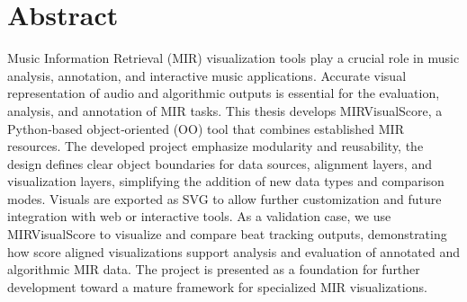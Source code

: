 \chapter*{Abstract}

Music Information Retrieval (MIR) visualization tools play a crucial role in music analysis, annotation, and interactive music applications. Accurate visual representation of audio and algorithmic outputs is essential for the evaluation, analysis, and annotation of MIR tasks. This thesis develops MIRVisualScore, a Python‑based object‑oriented (OO) tool that combines established MIR resources. The developed project emphasize modularity and reusability, the design defines clear object boundaries for data sources, alignment layers, and visualization layers, simplifying the addition of new data types and comparison modes. Visuals are exported as SVG to allow further customization and future integration with web or interactive tools. As a validation case, we use MIRVisualScore to visualize and compare beat tracking outputs, demonstrating how score aligned visualizations support analysis and evaluation of annotated and algorithmic MIR data. The project is presented as a foundation for further development toward a mature framework for specialized MIR visualizations.